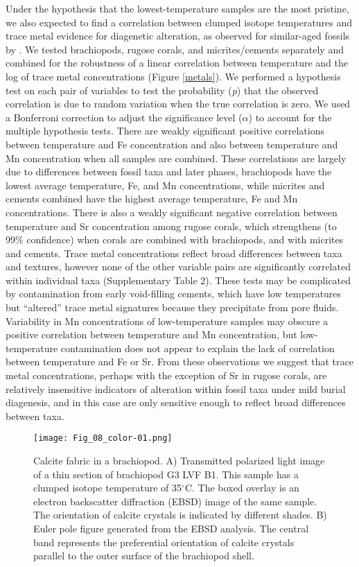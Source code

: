\documentclass[5p, authoryear]{elsarticle}
\begin{document}
Under the hypothesis that the lowest-temperature samples are the most pristine, we also expected to find a correlation between clumped isotope temperatures and trace metal evidence for diagenetic alteration, as observed for similar-aged fossils by \cite{Finnegan2011}. We tested brachiopods, rugose corals, and micrites/cements separately and combined for the robustness of a linear correlation between temperature and the log of trace metal concentrations (Figure \ref{metals}). We performed a hypothesis test on each pair of variables to test the probability (\textit{p}) that the observed correlation is due to random variation when the true correlation is zero. We used a Bonferroni correction to adjust the significance level ($\alpha$) to account for the multiple hypothesis tests. There are weakly significant positive correlations between temperature and Fe concentration and also between temperature and Mn concentration when all samples are combined. These correlations are largely due to differences between fossil taxa and later phases, brachiopods have the lowest average temperature, Fe, and Mn concentrations, while micrites and cements combined have the highest average temperature, Fe and Mn concentrations. There is also a weakly significant negative correlation between temperature and Sr concentration among rugose corals, which strengthens (to 99\% confidence) when corals are combined with brachiopods, and with micrites and cements. Trace metal concentrations reflect broad differences between taxa and textures, however none of the other variable pairs are significantly correlated within individual taxa (Supplementary Table 2). These tests may be complicated by contamination from early void-filling cements, which have low temperatures but ``altered'' trace metal signatures because they precipitate from pore fluids. Variability in Mn concentrations of low-temperature samples may obscure a positive correlation between temperature and Mn concentration, but low-temperature contamination does not appear to explain the lack of correlation between temperature and Fe or Sr. From these observations we suggest that trace metal concentrations, perhaps with the exception of Sr in rugose corals, are relatively insensitive indicators of alteration within fossil taxa under mild burial diagenesis, and in this case are only sensitive enough to reflect broad differences between taxa. 

\begin{figure*}[tb]
\centering
\texttt{[image: Fig\_08\_color-01.png]}
\caption{Calcite fabric in a brachiopod. A) Transmitted polarized light image of a thin section of brachiopod G3 LVF B1. This sample has a clumped isotope temperature of 35$^{\circ}$C. The boxed overlay is an electron backscatter diffraction (EBSD) image of the same sample. The orientation of calcite crystals is indicated by different shades. B) Euler pole figure generated from the EBSD analysis. The central band represents the preferential orientation of calcite crystals parallel to the outer surface of the brachiopod shell.}
\label{EBSD_brach}
\end{figure*}
\end{document}
